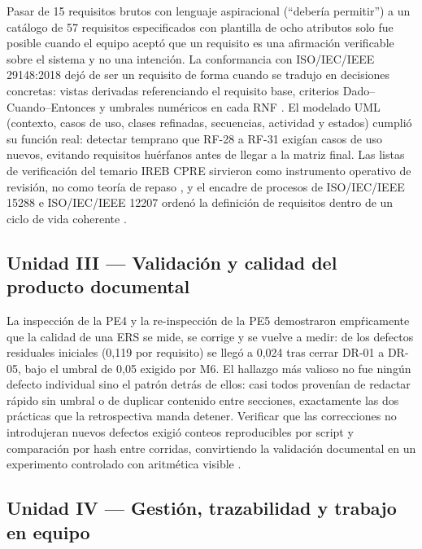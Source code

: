 Pasar de 15 requisitos brutos con lenguaje aspiracional (``deber\'ia permitir'') a un cat\'alogo de 57 requisitos especificados con plantilla de ocho atributos solo fue posible cuando el equipo acept\'o que un requisito es una afirmaci\'on verificable sobre el sistema y no una intenci\'on. La conformancia con ISO/IEC/IEEE 29148:2018 dej\'o de ser un requisito de forma cuando se tradujo en decisiones concretas: vistas derivadas referenciando el requisito base, criterios Dado--Cuando--Entonces y umbrales num\'ericos en cada RNF \cite{iso29148}. El modelado UML (contexto, casos de uso, clases refinadas, secuencias, actividad y estados) cumpli\'o su funci\'on real: detectar temprano que RF-28 a RF-31 exig\'ian casos de uso nuevos, evitando requisitos hu\'erfanos antes de llegar a la matriz final. Las listas de verificaci\'on del temario IREB CPRE sirvieron como instrumento operativo de revisi\'on, no como teor\'ia de repaso \cite{ireb2026}, y el encadre de procesos de ISO/IEC/IEEE 15288 e ISO/IEC/IEEE 12207 orden\'o la definici\'on de requisitos dentro de un ciclo de vida coherente \cite{iso15288,iso12207}.

\subsection*{Unidad III --- Validaci\'on y calidad del producto documental}

La inspecci\'on de la PE4 y la re-inspecci\'on de la PE5 demostraron emp\'ricamente que la calidad de una ERS se mide, se corrige y se vuelve a medir: de los defectos residuales iniciales (0,119 por requisito) se lleg\'o a 0,024 tras cerrar DR-01 a DR-05, bajo el umbral de 0,05 exigido por M6. El hallazgo m\'as valioso no fue ning\'un defecto individual sino el patr\'on detr\'as de ellos: casi todos proven\'ian de redactar r\'apido sin umbral o de duplicar contenido entre secciones, exactamente las dos pr\'acticas que la retrospectiva manda detener. Verificar que las correcciones no introdujeran nuevos defectos exigi\'o conteos reproducibles por script y comparaci\'on por hash entre corridas, convirtiendo la validaci\'on documental en un experimento controlado con aritm\'etica visible \cite{wohlin2012,iso25010}.

\subsection*{Unidad IV --- Gesti\'on, trazabilidad y trabajo en equipo}

